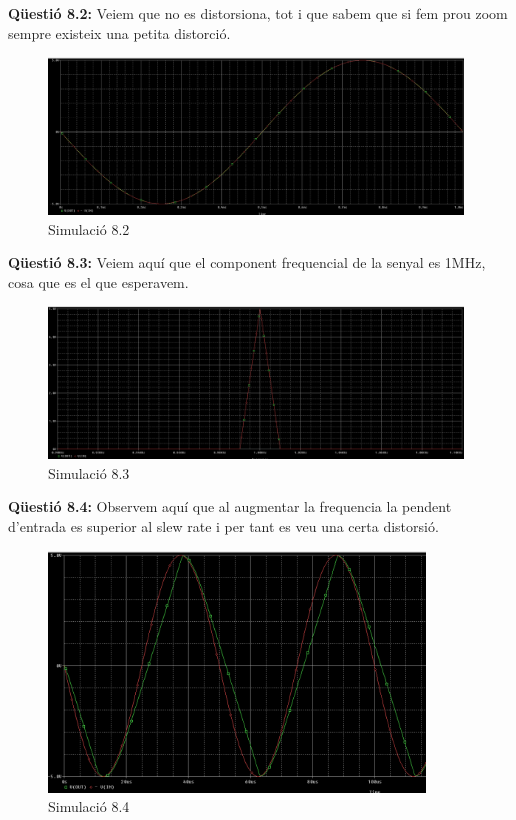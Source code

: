 \documentclass[12pt, a4papre]{article}
\begin{document}
	\textbf{Qüestió 8.2:} Veiem que no es distorsiona, tot i que sabem que si fem prou zoom sempre existeix una petita distorció.
	
	\begin{figure}[H]
		\begin{center}
		\includegraphics[width=110mm]{8_2.PNG}
		\caption{Simulació 8.2}
		\end{center}
	\end{figure}
	
	\textbf{Qüestió 8.3:} Veiem aquí que el component frequencial de la senyal es 1MHz, cosa que es el que esperavem.
	
	\begin{figure}[H]
		\begin{center}
		\includegraphics[width=110mm]{8_3.PNG}
		\caption{Simulació 8.3}
		\end{center}
	\end{figure}
	
	\textbf{Qüestió 8.4:} Observem aquí que al augmentar la frequencia la pendent d'entrada es superior al slew rate i per tant es veu una certa distorsió.
	
	\begin{figure}[H]
		\begin{center}
		\includegraphics[width=100mm]{8_4_1.PNG}
		\caption{Simulació 8.4}
		\end{center}
	\end{figure}
	
\end{document}
